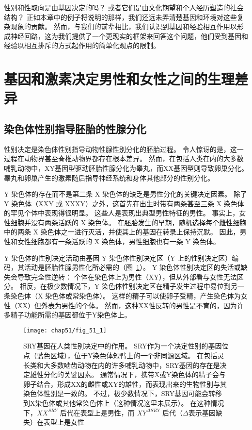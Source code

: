 性别和性取向是由基因决定的吗？
或者它们是由文化期望和个人经历塑造的社会结构？
正如本章中的例子将说明的那样，我们还远未弄清楚基因和环境对这些复杂现象的贡献。
然而，与我们的前辈相比，我们认识到基因和经验相互作用以形成神经回路，这为我们提供了一个更现实的框架来回答这个问题，他们受到基因和经验以相互排斥的方式起作用的简单化观点的限制。



\section{基因和激素决定男性和女性之间的生理差异}

\subsection{染色体性别指导胚胎的性腺分化}

性别决定是染色体性别指导动物性腺性别分化的胚胎过程。
令人惊讶的是，这一过程在动物界甚至脊椎动物界都存在根本差异。
然而，在包括人类在内的大多数哺乳动物中，XY基因型驱动胚胎性腺分化为睾丸，而XX基因型则导致卵巢分化。
睾丸和卵巢产生的激素随后指导神经系统和身体其他部分的性别分化。


Y 染色体的存在而不是第二条 X 染色体的缺乏是男性分化的关键决定因素。
除了 Y 染色体（XXY 或 XXXY）之外，这首先在出生时带有两条甚至三条 X 染色体的罕见个体中表现得很明显。
这些人是表现出典型男性特征的男性。
事实上，女性细胞并没有两条活跃的 X 染色体。
在胚胎发生的早期，随机选择每个雌性细胞中的两条 X 染色体之一进行灭活，并使其上的基因在转录上保持沉默。
因此，男性和女性细胞都有一条活跃的 X 染色体，男性细胞也有一条 Y 染色体。


Y 染色体的性别决定活动由基因 Y 染色体性别决定区（Y 上的性别决定区）编码，其活动是胚胎性腺男性化所必需的（图~\ref{fig:51_1}）。
Y 染色体性别决定区的失活或缺失会导致完全性逆转：
个体在染色体上为男性（XY），但从外部看与女性无法区分。
相反，在极少数情况下，Y 染色体性别决定区在精子发生过程中易位到另一条染色体（X 染色体或常染色体）。
这样的精子可以使卵子受精，产生染色体为女性（XX）但外表为男性的个体。
然而，这种XX性反转的男性是不育的，因为许多精子功能所需的基因都位于Y染色体上。


\begin{figure}[htbp]
	\centering
	\texttt{[image: chap51/fig\_51\_1]}
	\caption{SRY基因在人类性别决定中的作用。
		SRY作为一个决定性别的基因位点（蓝色区域），位于Y染色体短臂上的一个非同源区域。
		在包括灵长类和大多数啮齿动物在内的许多哺乳动物中，SRY基因的存在是决定雄性分化的关键因素。
		通常情况下，携带X或Y染色体的精子会与卵子结合，形成XX的雌性或XY的雄性，而表现出来的生物性别与其染色体性别是一致的。
		不过，极少数情况下，SRY基因可能会转移到X染色体或其他常染色体上（这种情况这里未展示）。
		在这种情况下，$ XX^{SRY} $ 后代在表型上是男性，而 $XY^{\Delta SRY}$ 后代（$ \Delta $表示基因缺失）在表型上是女性\cite{wilhelm2007sex} }
	\label{fig:51_1}
\end{figure}


